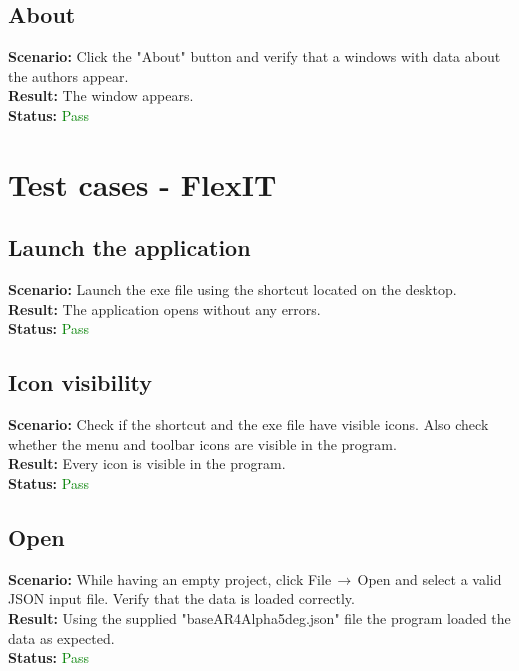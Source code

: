 \documentclass[a4paper, 11pt, article]{report}
\begin{document}
\subsection{About}

\noindent \textbf{Scenario:} Click the "About" button and verify that a windows with data about the authors appear.
\\
\noindent \textbf{Result:} The window appears.
\\
\noindent \textbf{Status:} \textcolor{green}{Pass}

\section{Test cases - FlexIT}

\subsection{Launch the application}

\noindent \textbf{Scenario:} Launch the exe file using the shortcut located on the desktop.
\\
\noindent \textbf{Result:} The application opens without any errors.
\\
\noindent \textbf{Status:} \textcolor{green}{Pass}

\subsection{Icon visibility}

\noindent \textbf{Scenario:} Check if the shortcut and the exe file have visible icons. Also check whether the menu and toolbar icons are visible in the program.
\\
\noindent \textbf{Result:} Every icon is visible in the program.
\\
\noindent \textbf{Status:} \textcolor{green}{Pass}

\subsection{Open}

\noindent \textbf{Scenario:} While having an empty project, click File$\,\to\,$Open and select a valid JSON input file. Verify that the data is loaded correctly.
\\
\noindent \textbf{Result:} Using the supplied "baseAR4Alpha5deg.json" file the program loaded the data as expected.
\\
\noindent \textbf{Status:} \textcolor{green}{Pass}
\end{document}
